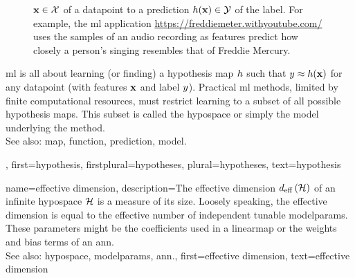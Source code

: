 {{\begin{figure}[htbp]
{				${\bf x} \in \mathcal{X}$ of a \gls{datapoint} to a \gls{prediction} $h({\bf x}) \in \mathcal{Y}$ of the \gls{label}. 
				For example, the \gls{ml} application \url{https://freddiemeter.withyoutube.com/} uses the samples of an audio 
				recording as \glspl{feature} predict how closely a person’s singing resembles that of Freddie Mercury.
				}
		\end{figure}
		\Gls{ml} is all about learning (or finding) a hypothesis \gls{map} $h$ 
		such that $y \approx h({\bf x})$ for any \gls{datapoint} 
		(with \glspl{feature} ${\bf x}$ and \gls{label} $y$). Practical \gls{ml} methods, 
		limited by finite computational resources, must restrict learning to a subset of all possible 
		hypothesis maps. This subset is called the \gls{hypospace} or simply the \gls{model} underlying 
		the method.
					\\ 
		See also: \gls{map}, \gls{function}, \gls{prediction}, \gls{model}.},
	first={hypothesis},
	firstplural={hypotheses},
	plural={hypotheses},
	text={hypothesis}  
}

{name={effective dimension},
	description={The effective dimension $d_{\rm eff} \left( \mathcal{H} \right)$ of 
		an infinite \gls{hypospace} $\mathcal{H}$ is a measure of its size. Loosely speaking, the 
		effective dimension is equal to the effective number of independent tunable \gls{modelparams}. 
		These \glspl{parameter} might be the coefficients used in a \gls{linearmap} or the 
		\gls{weights} and \gls{bias} terms of an \gls{ann}.
					\\ 
		See also: \gls{hypospace}, \gls{modelparams}, \gls{ann}.},
	first={effective dimension},
	text={effective dimension}  
}

